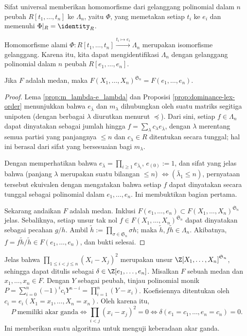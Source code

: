 Sifat universal memberikan homomorfisme dari gelanggang polinomial dalam $n$ peubah $R[t_1, \ldots, t_n]$ ke $\Lambda_n$, yaitu $\Phi$, yang memetakan setiap $t_i$ ke $e_i$ dan memenuhi $\Phi|_R = \identity_R$.
\begin{theorem}\label{prop:fund-thm-symmetric-poly}
	Homomorfisme alami $\Phi: R[t_1, \ldots, t_n] \xrightarrow{t_i \mapsto e_i} \Lambda_n$ merupakan isomorfisme gelanggang. Karena itu, kita dapat mengidentifikasi $\Lambda_n$ dengan gelanggang polinomial dalam $n$ peubah $R[e_1, \ldots, e_n]$.

	Jika $F$ adalah medan, maka $F(X_1, \ldots, X_n)^{\mathfrak{S}_n} = F(e_1, \ldots, e_n)$.
\end{theorem}
\begin{proof}
	Lema \ref{prop:m_lambda-e_lambda} dan Proposisi \ref{prop:dominance-lex-order} menunjukkan bahwa $e_{\bar{\lambda}}$ dan $m_\lambda$ dihubungkan oleh suatu matriks segitiga unipoten (dengan berbagai $\lambda$ diurutkan menurut $\preceq$). Dari sini, setiap $f \in \Lambda_n$ dapat dinyatakan sebagai jumlah hingga $f = \sum_\lambda c_\lambda e_{\bar{\lambda}}$, dengan $\lambda$ merentang semua partisi yang panjangnya $\leq n$ dan $c_\lambda \in R$ ditentukan secara tunggal; hal ini berasal dari sifat yang bersesuaian bagi $m_\lambda$.

	Dengan memperhatikan bahwa $e_{\bar{\lambda}} = \prod_{i \geq 1} e_{\bar{\lambda}_i}$, $e_{(0)} := 1$, dan sifat yang jelas bahwa (panjang $\lambda$ merupakan suatu bilangan $\leq n$) $\iff (\bar{\lambda}_1 \leq n)$, pernyataan tersebut ekuivalen dengan mengatakan bahwa setiap $f$ dapat dinyatakan secara tunggal sebagai polinomial dalam $e_1, \ldots, e_n$. Ini membuktikan bagian pertama.

	Sekarang andaikan $F$ adalah medan. Inklusi $F(e_1, \ldots, e_n) \subset F(X_1, \ldots, X_n)^{\mathfrak{S}_n}$ jelas. Sebaliknya, setiap unsur tak nol $f \in F(X_1, \ldots, X_n)^{\mathfrak{S}_n}$ dapat dinyatakan sebagai pecahan $g/h$. Ambil $\tilde{h} := \prod_{\sigma \in \mathfrak{S}_n} \sigma h$; maka $\tilde{h}, f\tilde{h} \in \Lambda_n$. Akibatnya, $f = f\tilde{h}/\tilde{h} \in F(e_1, \ldots, e_n)$, dan bukti selesai.
\end{proof}

\begin{example}[Diskriminan]\label{eg:polynomial-discriminant} 
	Jelas bahwa $\displaystyle\prod_{1 \leq i < j \leq n} (X_i - X_j)^2$ merupakan unsur $\Z[X_1, \ldots, X_n]^{\mathfrak{S}_n}$, sehingga dapat ditulis sebagai $\delta \in \Z[e_1, \ldots, e_n]$. Misalkan $F$ sebuah medan dan $x_1, \ldots, x_n \in F$. Dengan $Y$ sebagai peubah, tinjau polinomial monik $P = \sum_{i=0}^n (-1)^i c_i Y^{n-i} = \prod_{i=1}^n (Y - x_i)$. Koefisiennya ditentukan oleh $c_i = e_i(X_1 = x_1, \ldots, X_n = x_n)$. Oleh karena itu,
	\[ P\; \text{memiliki akar ganda} \iff \prod_{i < j} (x_i - x_j)^2 = 0 \iff \delta(e_1 = c_1, \ldots, e_n = c_n) = 0. \]
	Ini memberikan suatu algoritma untuk menguji keberadaan akar ganda.
\end{example}

